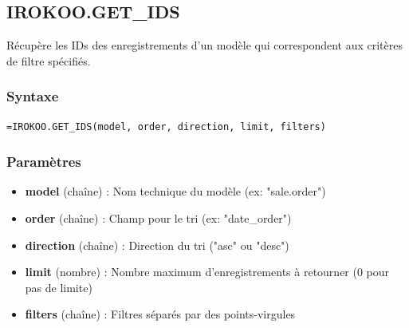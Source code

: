 \documentclass[12pt, a4paper]{article}
\begin{document}
\subsection{IROKOO.GET\_IDS}
\begin{tcolorbox}[title=Description]
Récupère les IDs des enregistrements d'un modèle qui correspondent aux critères de filtre spécifiés.
\end{tcolorbox}

\subsubsection{Syntaxe}
\begin{lstlisting}
=IROKOO.GET_IDS(model, order, direction, limit, filters)
\end{lstlisting}

\subsubsection{Paramètres}
\begin{itemize}
    \item \textbf{model} (chaîne) : Nom technique du modèle (ex: "sale.order")
    \item \textbf{order} (chaîne) : Champ pour le tri (ex: "date\_order")
    \item \textbf{direction} (chaîne) : Direction du tri ("asc" ou "desc")
    \item \textbf{limit} (nombre) : Nombre maximum d'enregistrements à retourner (0 pour pas de limite)
    \item \textbf{filters} (chaîne) : Filtres séparés par des points-virgules
\end{itemize}
\end{document}
